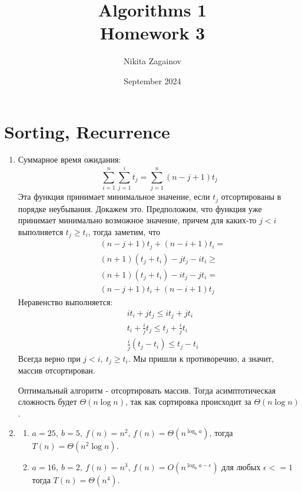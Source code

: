 \documentclass{article}
\title{Algorithms 1 \\ Homework 3}
\author{Nikita Zagainov}
\date{September 2024}
\begin{document}
\maketitle
\section{Sorting, Recurrence}
\begin{enumerate}
    \item Суммарное время ожидания:
          $$
              \sum_{i=1}^n{\sum_{j=1}^i{t_j}} = \sum_{j=1}^n{(n-j+1)t_j}
          $$
          Эта функция принимает минимальное значение, если $t_j$ отсортированы в порядке неубывания. Докажем это. Предположим, что функция уже принимает минимально возможное значение, причем для каких-то $j < i$ выполняется $t_j \geq t_i$, тогда заметим, что
          \begin{align*}
               & (n - j + 1)t_j + (n - i + 1)t_i =     \\
               & (n + 1)(t_j + t_i) - jt_j - it_i \geq \\
               & (n + 1)(t_j + t_i) - it_j - jt_i =    \\
               & (n - j + 1)t_i + (n - i + 1)t_j
          \end{align*}
          Неравенство выполняется:
          \begin{align*}
               & it_i + jt_j \leq it_j + jt_i                   \\
               & t_i + \frac{i}{j}t_j \leq t_j + \frac{i}{j}t_i \\
               & \frac{i}{j}(t_j - t_i) \leq t_j - t_i
          \end{align*}
          Всегда верно при $j < i, \ t_j \geq t_i$.
          Мы пришли к противоречию, а значит, массив отсортирован.

          Оптимальный алгоритм - отсортировать массив. Тогда асимптотическая сложность будет $\Theta(n\log{n})$, так как сортировка происходит за $\Theta(n\log{n})$.

    \item
          \begin{enumerate}
              \item[1.] $a = 25, \ b = 5, \ f(n) = n^2$, $f(n) = \Theta(n^{\log_b{a}})$, тогда $T(n) = \Theta(n^2\log{n})$.

              \item[2.] $a = 16, \ b = 2, \ f(n) = n^3$, $f(n) = O(n^{\log_b{a} - \epsilon})$ для любых $\epsilon <= 1$ тогда $T(n) = \Theta(n^4)$.


\end{enumerate}
\end{enumerate}
\end{document}
